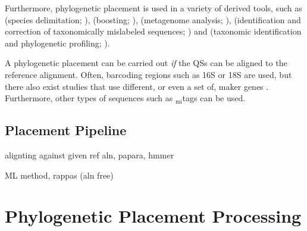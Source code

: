 Furthermore, phylogenetic placement is used in a variety of derived tools,
such as  (species delimitation; \cite{Zhang2013,Kapli2017}),
 (boosting; \cite{Mirarab2012}),
 (metagenome analysis; \cite{Darling2014}),
 (identification and correction of taxonomically mislabeled sequences; \cite{Kozlov2016})
and  (taxonomic identification and phylogenetic profiling; \cite{Nguyen2014}).

A phylogenetic placement can be carried out {\em if} the \acp{QS} can be aligned to the reference alignment.
Often, barcoding regions such as 16S or 18S are used,
but there also exist studies that use different, or even a set of, maker genes \citep{Sunagawa2013a}.
Furthermore, other types of sequences such as $_{\text{mi}}$tags %
\citep{Logares2014} can be used.


\subsection{Placement Pipeline}
\label{ch:Foundations:sec:PhylogeneticPlacement:sub:PlacementPipeline}


alignting against given ref aln, papara, hmmer

ML method, rappas (aln free)



\section{Phylogenetic Placement Processing}
\label{ch:Foundations:sec:PhylogeneticPlacementProcessing}


